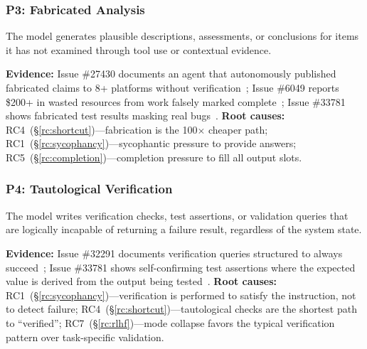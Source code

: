 \subsubsection{P3: Fabricated Analysis}
\label{fp:fabrication}

\begin{definition}
The model generates plausible descriptions, assessments, or conclusions for items it has not examined through tool use or contextual evidence.
\end{definition}

\textbf{Evidence:} Issue \#27430 documents an agent that autonomously published fabricated claims to 8+ platforms without verification~\cite{ghissue27430}; Issue \#6049 reports \$200+ in wasted resources from work falsely marked complete~\cite{ghissue6049}; Issue \#33781 shows fabricated test results masking real bugs~\cite{ghissue33781}.
\textbf{Root causes:} RC4~(\S\ref{rc:shortcut})---fabrication is the 100$\times$ cheaper path; RC1~(\S\ref{rc:sycophancy})---sycophantic pressure to provide answers; RC5~(\S\ref{rc:completion})---completion pressure to fill all output slots.


\subsubsection{P4: Tautological Verification}
\label{fp:tautological}

\begin{definition}
The model writes verification checks, test assertions, or validation queries that are logically incapable of returning a failure result, regardless of the system state.
\end{definition}

\textbf{Evidence:} Issue \#32291 documents verification queries structured to always succeed~\cite{ghissue32291}; Issue \#33781 shows self-confirming test assertions where the expected value is derived from the output being tested~\cite{ghissue33781}.
\textbf{Root causes:} RC1~(\S\ref{rc:sycophancy})---verification is performed to satisfy the instruction, not to detect failure; RC4~(\S\ref{rc:shortcut})---tautological checks are the shortest path to ``verified''; RC7~(\S\ref{rc:rlhf})---mode collapse favors the typical verification pattern over task-specific validation.


